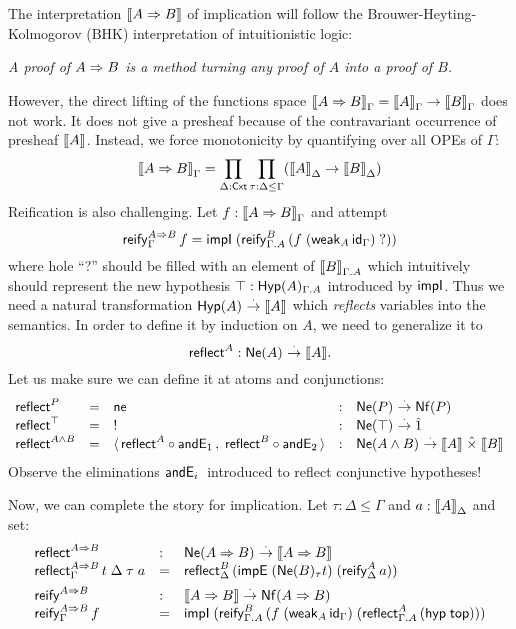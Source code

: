\documentclass[a4paper]{article}
\begin{document}
The interpretation $\den{A \imp B}$ of implication will follow the
Brouwer-Heyting-Kolmogorov (BHK) interpretation of intuitionistic
logic:
\begin{center}\itshape
  A proof of $A \imp B$ is a method turning any proof of $A$ into a
  proof of $B$.
\end{center}
However, the direct lifting of the functions space $\den{A \imp
  B}_\Gamma = \den A_\Gamma \to \den B_\Gamma$ does not work.  It does
not give a presheaf because of the contravariant occurrence of
presheaf $\den A$.  Instead, we force monotonicity by quantifying over
all OPEs of $\Gamma$:
\[
  \den{A \imp B}_\Gamma = \prod_{\Delta : \Cxt} \prod_{\tau : \Delta \leq \Gamma} (\den A
  _\Delta \to \den B _\Delta)
\]
Reification is also challenging.  Let $f : \den{A \imp B}_\Gamma$ and
attempt
\[
  \reify[\Gamma]{A \imp B} f %
    = \impIP {\reify[\Gamma.A]B{(f\;(\weak[A]{\id[\Gamma]})}\;\mbox{?})}
\]
where hole ``?'' should be filled with an element of $\den B_{\Gamma.A}$
which intuitively should represent the new hypothesis $\top :
\Hyp[\Gamma.A]A$ introduced by $\timpI$.  Thus we need a natural
transformation $\Hyp A \todot \den A$ which \emph{reflects} variables
into the semantics.  In order to define it by
induction on $A$, we need to generalize it to
\[
  \treflect^A : \Ne A \todot \den A
  .
\]
Let us make sure we can define it at atoms and conjunctions:
\[
\begin{array}{lllll}
  \treflect^P & = & \tne & : & \Ne P \todot \Nf P \\
  \treflect^\top & = & !  & : & \Ne \top \todot \hatone \\
  \treflect^{A \land B} & = & \langle\, \treflect^A \comp \andE1  , \;
                             \treflect^B \comp \andE2 \rangle
    & : & \Ne{A \land B} \todot \den A \hattimes \den B \\
\end{array}
\]
Observe the eliminations $\andE i$ introduced to reflect conjunctive hypotheses!

Now, we can complete the story for implication.  Let $\tau : \Delta
\leq \Gamma$ and $a : \den A_\Delta$ and set:
\[
\begin{array}{lll}
  \treflect^{A \imp B} & : & \Ne{A \imp B} \todot \den{A \imp B} \\
  \reflect[\Gamma]{A \imp B} t\;\Delta\;\tau\;a & = &
    \reflect[\Delta]B{(\impEP {\Ne[\tau] B t} {(\reify[\Delta] A a)})}
\\[1ex]
  \treify^{A \imp B} & : & \den{A \imp B} \todot \Nf{A \imp B} \\
  \reify[\Gamma]{A \imp B} f & = &
    \impIP {\reify[\Gamma.A]B{(f\;(\weak[A]{\id[\Gamma]})}\;(\reflect[\Gamma.A]A{(\hyp\ttop)})}
\end{array}
\]
\end{document}

